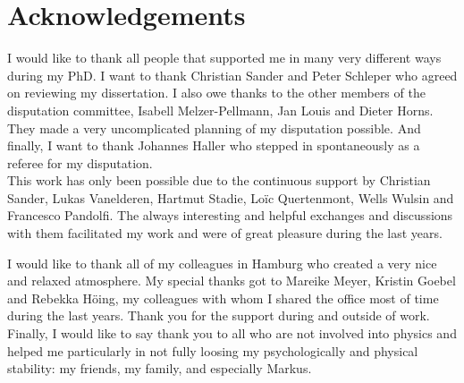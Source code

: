\chapter*{Acknowledgements}
\vspace{1cm}

I would like to thank all people that supported me in many very different ways during my PhD.
I want to thank Christian Sander and Peter Schleper who agreed on reviewing my dissertation.
I also owe thanks to the other members of the disputation committee, Isabell Melzer-Pellmann, Jan Louis and Dieter Horns.
They made a very uncomplicated planning of my disputation possible.
And finally, I want to thank Johannes Haller who stepped in spontaneously as a referee for my disputation.\\

This work has only been possible due to the continuous support by Christian Sander, Lukas Vanelderen, Hartmut Stadie, Lo\"{i}c Quertenmont, Wells Wulsin and Francesco Pandolfi.
The always interesting and helpful exchanges and discussions with them facilitated my work and were of great pleasure during the last years. 

I would like to thank all of my colleagues in Hamburg who created a very nice and relaxed atmosphere. 
My special thanks got to Mareike Meyer, Kristin Goebel and Rebekka H\"{o}ing, my colleagues with whom I shared the office most of time during the last years. 
Thank you for the support during and outside of work.\\

Finally, I would like to say thank you to all who are not involved into physics and helped me particularly in not fully loosing my psychologically and physical stability: my friends, my family, and especially Markus.
